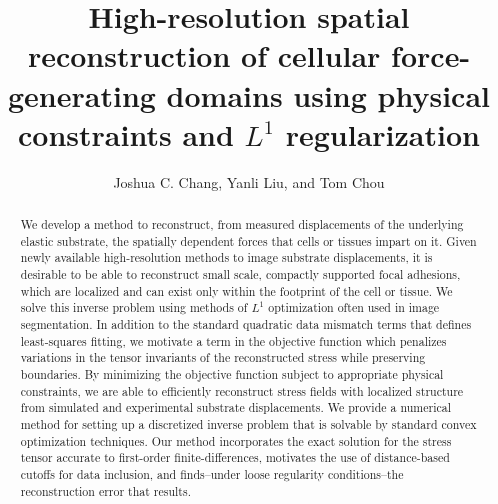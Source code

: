 \documentclass[aps,prl,reprint,twocolumn,groupedaddress,showpacs]{revtex4}
\begin{document}
\title{High-resolution spatial reconstruction of cellular
  force-generating domains using physical constraints and $L^{1}$
  regularization}

\author{Joshua C. Chang, Yanli Liu, and Tom Chou}
 






\begin{abstract}
We develop a method to reconstruct, from measured displacements of the
underlying elastic substrate, the spatially dependent forces that
cells or tissues impart on it.  Given newly available high-resolution
methods to image substrate displacements, it is desirable to be able
to reconstruct small scale, compactly supported focal adhesions, which
are localized and can exist only within the footprint of the cell or
tissue.  We solve this inverse problem using methods of $L^{1}$
optimization often used in image segmentation. In addition to the
standard quadratic data mismatch terms that defines least-squares
fitting, we motivate a term in the objective function which penalizes
variations in the tensor invariants of the reconstructed stress while
preserving boundaries.  By minimizing the objective function subject
to appropriate physical constraints, we are able to efficiently
reconstruct stress fields with localized structure from simulated and
experimental substrate displacements. We provide a numerical method
for setting up a discretized inverse problem that is solvable by
standard convex optimization techniques. Our method incorporates the
exact solution for the stress tensor accurate to first-order
finite-differences, motivates the use of distance-based cutoffs for
data inclusion, and finds--under loose regularity conditions--the
reconstruction error that results.
\end{abstract}
\maketitle
\end{document}
